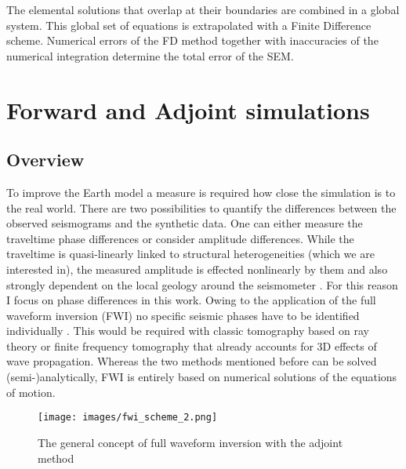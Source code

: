 The elemental solutions that overlap at their boundaries are combined in a global system. 
This global set of equations is extrapolated with a Finite Difference scheme.
Numerical errors of the FD method together with inaccuracies of the numerical integration determine the total error of the SEM.



\section{Forward and Adjoint simulations}


\subsection{Overview}
To improve the Earth model a measure is required how close the simulation is to the real world. 
There are two possibilities to quantify the differences between the observed seismograms and the synthetic data.
One can either measure the traveltime phase differences or consider amplitude differences.
While the traveltime is quasi-linearly linked to structural heterogeneities (which we are interested in),
the measured amplitude is effected nonlinearly by them and also strongly dependent on the local geology 
around the seismometer \citep{Fichtner2008}.
For this reason I focus on phase differences in this work.
Owing to the application of the full waveform inversion (FWI) no specific seismic phases have to be identified 
individually \citep{Fichtner2011a}. 
This would be required with classic tomography based on ray theory or finite frequency tomography that already 
accounts for 3D effects of wave propagation. %
Whereas the two methods mentioned before can be solved (semi-)analytically, FWI is entirely based on numerical
solutions of the equations of motion.

\begin{figure}[h]
\begin{center}
\texttt{[image: images/fwi\_scheme\_2.png]}
\caption{The general concept of full waveform inversion with the adjoint method}
\label{adjoint_scheme}
\end{center}
\end{figure}

